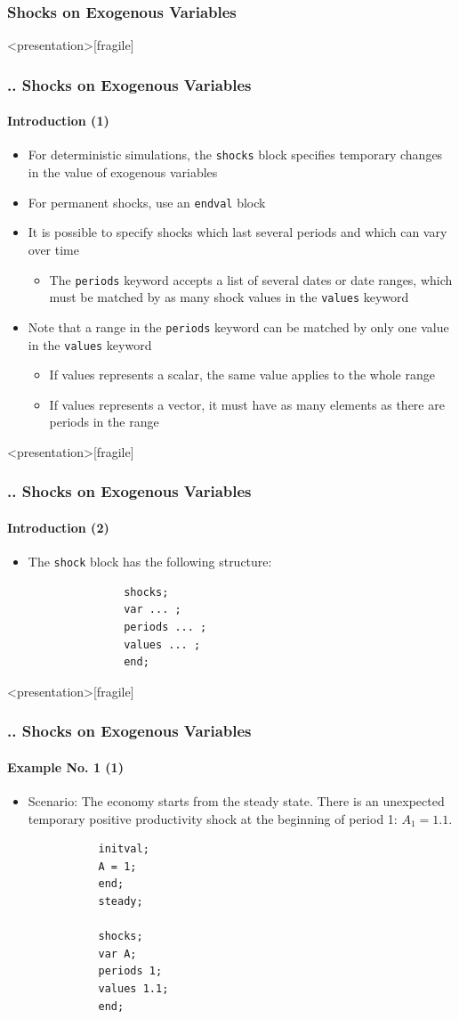 \documentclass[11pt,aspectratio=169]{beamer}
\begin{document}
\subsubsection{Shocks on Exogenous Variables}
\begin{frame}<presentation>[fragile]
	\frametitle{{\thesection.\thesubsection.\thesubsubsection} Shocks on Exogenous Variables}
	\framesubtitle{Introduction (1)}
	\begin{itemize}
		\item For deterministic simulations, the \texttt{shocks} block specifies temporary changes in the value of exogenous variables 
		\item For permanent shocks, use an \texttt{endval} block
		\item It is possible to specify shocks which last several periods and which can vary over time  
		\begin{itemize}
			\item The \texttt{periods} keyword accepts a list of several dates or date ranges, which must be matched by as many shock values in the \texttt{values} keyword
		\end{itemize}
		\item Note that a range in the \texttt{periods} keyword can be matched by only one value in the \texttt{values} keyword  
		\begin{itemize}
			\item If values represents a scalar, the same value applies to the whole range
			\item If values represents a vector, it must have as many elements as there are periods in the range
		\end{itemize}
	\end{itemize}
\end{frame}
\begin{frame}<presentation>[fragile]
	\frametitle{{\thesection.\thesubsection.\thesubsubsection} Shocks on Exogenous Variables}
	\framesubtitle{Introduction (2)}
	\begin{itemize}
		\item The \texttt{shock} block has the following structure:
			\begin{verbatim}
			   shocks;
			   var ... ;
			   periods ... ;
			   values ... ;
			   end;
			\end{verbatim}
	\end{itemize}
\end{frame}
\begin{frame}<presentation>[fragile]
	\frametitle{{\thesection.\thesubsection.\thesubsubsection} Shocks on Exogenous Variables}
	\framesubtitle{Example No. 1 (1)}
	\begin{itemize}
		\item Scenario: The economy starts from the steady state. There is an unexpected temporary positive productivity shock at the beginning of period 1: $A_1 = 1.1$.
		\begin{verbatim}
		   initval;
		   A = 1;
		   end;
		   steady;
		
		   shocks;
		   var A;
		   periods 1;
		   values 1.1;
		   end;
		\end{verbatim}
	\end{itemize}
\end{frame}
\end{document}
